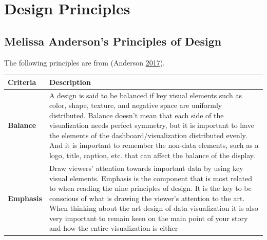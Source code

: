 \documentclass[]{book}
\begin{document}
\section{Design Principles}\label{design-principles}

\subsection{Melissa Anderson's Principles of
Design}\label{melissa-andersons-principles-of-design}

The following principles are from (Anderson
\protect\hyperlink{ref-design_principles}{2017}).

\begin{longtable}[]{@{}ll@{}}
\toprule
\begin{minipage}[b]{0.16\columnwidth}\raggedright\strut
\textbf{Criteria}\strut
\end{minipage} & \begin{minipage}[b]{0.78\columnwidth}\raggedright\strut
\textbf{Description}\strut
\end{minipage}\tabularnewline
\midrule
\endhead
\begin{minipage}[t]{0.16\columnwidth}\raggedright\strut
\textbf{Balance}\strut
\end{minipage} & \begin{minipage}[t]{0.78\columnwidth}\raggedright\strut
A design is said to be balanced if key visual elements such as color,
shape, texture, and negative space are uniformly distributed. Balance
doesn't mean that each side of the visualization needs perfect symmetry,
but it is important to have the elements of the dashboard/visualization
distributed evenly. And it is important to remember the non-data
elements, such as a logo, title, caption, etc. that can affect the
balance of the display.\strut
\end{minipage}\tabularnewline
\begin{minipage}[t]{0.16\columnwidth}\raggedright\strut
\textbf{Emphasis}\strut
\end{minipage} & \begin{minipage}[t]{0.78\columnwidth}\raggedright\strut
Draw viewers' attention towards important data by using key visual
elements. Emphasis is the component that is most related to when reading
the nine principles of design. It is the key to be conscious of what is
drawing the viewer's attention to the art. When thinking about the art
design of data visualization it is also very important to remain keen on
the main point of your story and how the entire visualization is either

\end{minipage}
\end{longtable}
\end{document}
